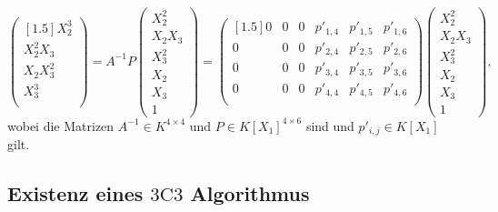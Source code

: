 \documentclass[a4paper,oneside, 11pt, openany%
]{article}
\theoremstyle{custom}
\theoremstyle{custom}
\begin{document}
	\begin{equation}
		\begin{pmatrix}[1.5]
			X_{2}^3\\		
			X_{2}^2X_{3}\\
			X_{2}X_{3}^2\\
			X_{3}^3\\
		\end{pmatrix}
		=A^{-1}P
		\begin{pmatrix}
			X_{2}^2\\X_{2}X_{3}\\X_{3}^2\\X_{2}\\X_{3}\\1
		\end{pmatrix}
		=
		\begin{pmatrix}[1.5]
			0&	0&	0&	p'_{1,4}&	p'_{1,5}&	p'_{1,6}\\
			0&	0&	0&	p'_{2,4}&	p'_{2,5}&	p'_{2,6}\\
			0&	0&	0&	p'_{3,4}&	p'_{3,5}&	p'_{3,6}\\
			0&	0&	0&	p'_{4,4}&	p'_{4,5}&	p'_{4,6}\\
		\end{pmatrix}
		\begin{pmatrix}
			X_{2}^2\\X_{2}X_{3}\\X_{3}^2\\X_{2}\\X_{3}\\1
		\end{pmatrix},
	\end{equation}
	wobei die Matrizen $A^{-1} \in K^{4 \times 4}$ und $P \in K[X_1]^{4 \times 6}$ sind und $p'_{i,j} \in K[X_1]$ gilt.
	


	
	\subsection{Existenz eines $3\text{C}3$ Algorithmus}\label{sec:3C3}
	
\end{document}
